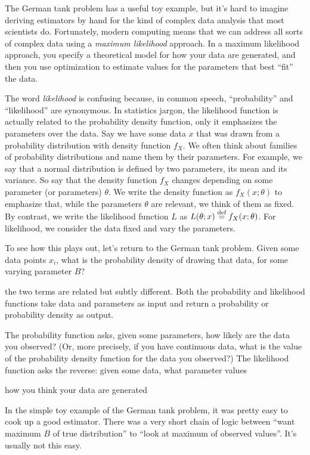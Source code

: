 The German tank problem has a useful toy example, but it's hard to imagine deriving
estimators by hand for the kind of complex data analysis that most scientists do.
Fortunately, modern computing means that we can address all sorts of complex data
using a \emph{maximum likelihood} approach. In a maximum likelihood approach, you
specify a theoretical model for how your data are generated, and then you use optimization to estimate values for the parameters that best ``fit'' the data.

The word \emph{likelihood} is confusing because, in common speech, ``probability''
and ``likelihood'' are synonymous. In statistics jargon, the likelihood function
is actually related to the probability density function, only it emphasizes the
parameters over the data. Say we have some data $x$ that was drawn from a probability 
distribution with density function $f_X$. We often think about families of probability
distributions and name them by their parameters. For example, we say that a normal
distribution is defined by two parameters, its mean and its variance. So say that
the density function $f_X$ changes depending on some parameter (or parameters) $\theta$.
We write the density function as $f_X(x; \theta)$ to emphasize that, while the
parameters $\theta$ are relevant, we think of them as fixed. By contrast, we write
the likelihood function $L$ as $L(\theta; x) \stackrel{\text{def}}{=} f_X(x; \theta)$. For likelihood,
we consider the data fixed and vary the parameters.

To see how this plays out, let's return to the German tank problem. Given some data
points $x_i$, what is the probability density of drawing that data, for some varying
parameter $B$?

\vspace{1in}


the two terms are related
but subtly different. Both the probability and likelihood functions take data
and parameters as input and return a probability or probability density as output.

The probability function asks, given some parameters, how
likely are the data you observed? (Or, more precisely, if you have continuous data,
what is the value of the probability density function for the data you observed?)
The likelihood function asks the reverse: given some data, what parameter values


how you think your
data are generated

In the simple toy example of the German tank problem, it was pretty easy to
cook up a good estimator. There was a very short chain of logic between ``want
maximum $B$ of true distribution'' to ``look at maximum of observed values''.
It's usually not this easy.

